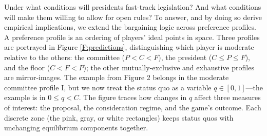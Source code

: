 \documentclass[letter,12pt]{article}
\begin{document}
Under what conditions will presidents fast-track legislation? And what conditions will make them willing to allow for open rules? To answer, and by doing so derive empirical implications, we extend the bargaining logic across preference profiles. A preference profile is an ordering of players' ideal points in space. Three profiles are portrayed in Figure \ref{F:predictions}, distinguishing which player is moderate relative to the others: the committee ($P<C<F$), the president ($C \leq P \leq F$), and the floor ($C<F<P$); the other mutually-exclusive and exhaustive profiles are mirror-images. The example from Figure 2 belongs in the moderate committee profile I, but we now treat the status quo as a variable $q \in [0,1]$---the example is in $0 \leq q < C$. The figure traces how changes in $q$ affect three measures of interest: the proposal, the consideration regime, and the game's outcome. Each discrete zone (the pink, gray, or white rectangles) keeps status quos with unchanging equilibrium components together.

\end{document}
